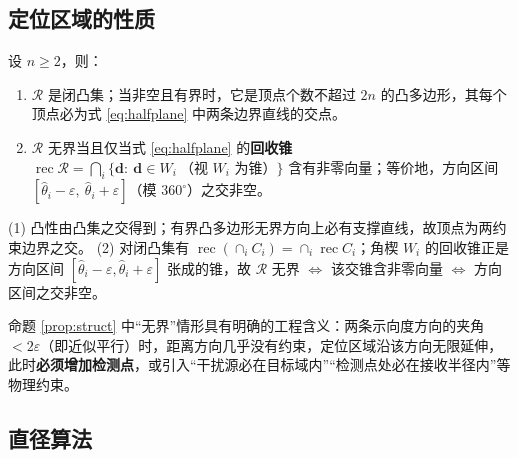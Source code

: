 \subsection{定位区域的性质}

\begin{proposition}[结构性]\label{prop:struct}
设 $n\ge2$，则：
\begin{enumerate}
  \item $\mathcal{R}$ 是闭凸集；当非空且有界时，它是顶点个数不超过 $2n$ 的凸多边形，其每个顶点必为式 \eqref{eq:halfplane} 中两条边界直线的交点。
  \item $\mathcal{R}$ 无界当且仅当式 \eqref{eq:halfplane} 的\textbf{回收锥}
  $\operatorname{rec}\mathcal{R}=\bigcap_i\{\mathbf d:\ \mathbf d\in W_i\ \text{（视 $W_i$ 为锥）}\}$
  含有非零向量；等价地，方向区间
  $[\hat\theta_i-\varepsilon,\ \hat\theta_i+\varepsilon]$（模 $360^{\circ}$）之交非空。
\end{enumerate}
\end{proposition}

\begin{pf}
(1) 凸性由凸集之交得到；有界凸多边形无界方向上必有支撑直线，故顶点为两约束边界之交。
(2) 对闭凸集有 $\operatorname{rec}(\cap_i C_i)=\cap_i\operatorname{rec}C_i$；角楔 $W_i$ 的回收锥正是方向区间 $[\hat\theta_i-\varepsilon,\hat\theta_i+\varepsilon]$ 张成的锥，故 $\mathcal{R}$ 无界 $\iff$ 该交锥含非零向量 $\iff$ 方向区间之交非空。
\end{pf}

命题 \ref{prop:struct} 中“无界”情形具有明确的工程含义：两条示向度方向的夹角 $<2\varepsilon$（即近似平行）时，距离方向几乎没有约束，定位区域沿该方向无限延伸，此时\textbf{必须增加检测点}，或引入“干扰源必在目标域内”“检测点处必在接收半径内”等物理约束。

\subsection{直径算法}

